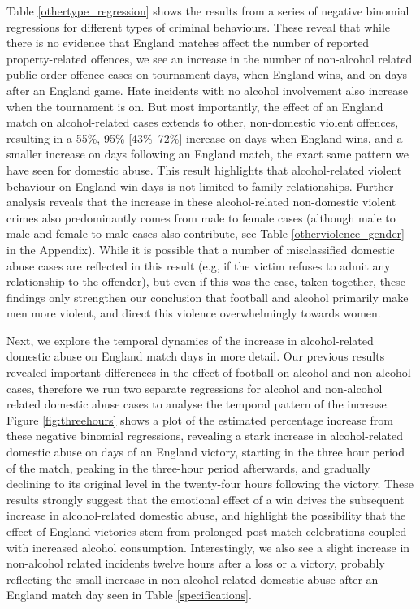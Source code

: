 \documentclass[12pt, letterpaper]{article}
\begin{document}
Table \ref{othertype_regression} shows the results from a series of negative binomial regressions for different types of criminal behaviours. These reveal that while there is no evidence that England matches affect the number of reported property-related offences, we see an increase in the number of non-alcohol related public order offence cases on tournament days, when England wins, and on days after an England game. Hate incidents with no alcohol involvement also increase when the tournament is on. But most importantly, the effect of an England match on alcohol-related cases extends to other, non-domestic violent offences, resulting in a 55\%, 95\% [43\%--72\%] increase on days when England wins, and a smaller increase on days following an England match, the exact same pattern we have seen for domestic abuse. This result highlights that alcohol-related violent behaviour on England win days is not limited to family relationships. Further analysis reveals that the increase in these alcohol-related non-domestic violent crimes also predominantly comes from male to female cases (although male to male and female to male cases also contribute, see Table \ref{otherviolence_gender} in the Appendix). While it is possible that a number of misclassified domestic abuse cases are reflected in this result (e.g, if the victim refuses to admit any relationship to the offender), but even if this was the case, taken together, these findings only strengthen our conclusion that football and alcohol primarily make men more violent, and direct this violence overwhelmingly towards women.



Next, we explore the temporal dynamics of the increase in alcohol-related domestic abuse on England match days in more detail. Our previous results revealed important differences in the effect of football on alcohol and non-alcohol cases, therefore we run two separate regressions for alcohol and non-alcohol related domestic abuse cases to analyse the temporal pattern of the increase. Figure \ref{fig:threehours} shows a plot of the estimated percentage increase from these negative binomial regressions, revealing a stark increase in alcohol-related domestic abuse on days of an England victory, starting in the three hour period of the match, peaking in the three-hour period afterwards, and gradually declining to its original level in the twenty-four hours following the victory. These results strongly suggest that the emotional effect of a win drives the subsequent increase in alcohol-related domestic abuse, and highlight the possibility that the effect of England victories stem from prolonged post-match celebrations coupled with increased alcohol consumption.  Interestingly, we also see a slight increase in non-alcohol related incidents twelve hours after a loss or a victory, probably reflecting the small increase in non-alcohol related domestic abuse after an England match day seen in Table \ref{specifications}.
\end{document}
